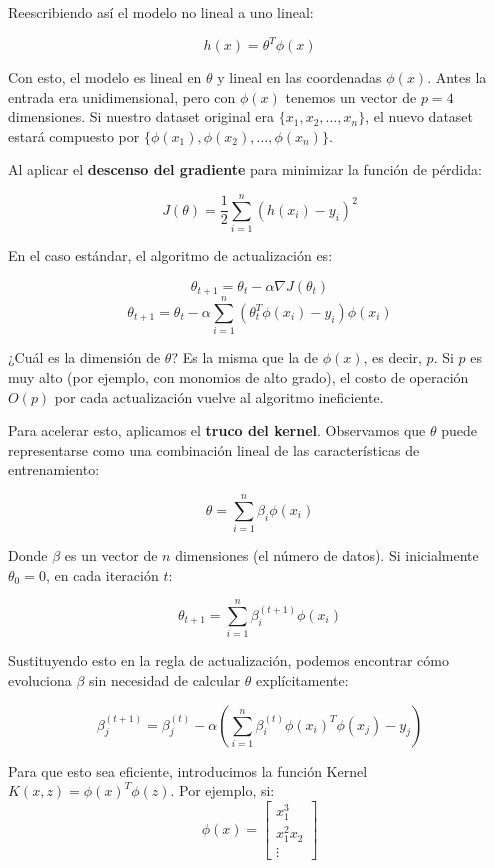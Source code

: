 Reescribiendo así el modelo no lineal a uno lineal:

\[ h(x) = \theta^T \phi(x) \]

Con esto, el modelo es lineal en $\theta$ y lineal en las coordenadas $\phi(x)$. Antes la entrada era unidimensional, pero con $\phi(x)$ tenemos un vector de $p=4$ dimensiones. Si nuestro dataset original era $\{x_1, x_2, \dots, x_n\}$, el nuevo dataset estará compuesto por $\{\phi(x_1), \phi(x_2), \dots, \phi(x_n)\}$.

Al aplicar el \textbf{descenso del gradiente} para minimizar la función de pérdida:

\[ J(\theta) = \frac{1}{2} \sum_{i=1}^{n} (h(x_i) - y_i)^2 \]

En el caso estándar, el algoritmo de actualización es:

\[ \theta_{t+1} = \theta_t - \alpha \nabla J(\theta_t) \]
\[ \theta_{t+1} = \theta_t - \alpha \sum_{i=1}^n (\theta_t^T \phi(x_i) - y_i) \phi(x_i) \]

¿Cuál es la dimensión de $\theta$? Es la misma que la de $\phi(x)$, es decir, $p$. Si $p$ es muy alto (por ejemplo, con monomios de alto grado), el costo de operación $O(p)$ por cada actualización vuelve al algoritmo ineficiente. 

Para acelerar esto, aplicamos el \textbf{truco del kernel}. Observamos que $\theta$ puede representarse como una combinación lineal de las características de entrenamiento:

\[ \theta = \sum_{i=1}^n \beta_i \phi(x_i) \]

Donde $\beta$ es un vector de $n$ dimensiones (el número de datos). Si inicialmente $\theta_0 = 0$, en cada iteración $t$:

\[ \theta_{t+1} = \sum_{i=1}^n \beta_i^{(t+1)} \phi(x_i) \]

Sustituyendo esto en la regla de actualización, podemos encontrar cómo evoluciona $\beta$ sin necesidad de calcular $\theta$ explícitamente:

\[ \beta_j^{(t+1)} = \beta_j^{(t)} - \alpha \left( \sum_{i=1}^n \beta_i^{(t)} \phi(x_i)^T \phi(x_j) - y_j \right) \]

Para que esto sea eficiente, introducimos la función Kernel $K(x, z) = \phi(x)^T \phi(z)$. Por ejemplo, si:
\[ \phi(x) = \begin{bmatrix} x_1^3 \\ x_1^2 x_2 \\ \vdots \end{bmatrix} \]

